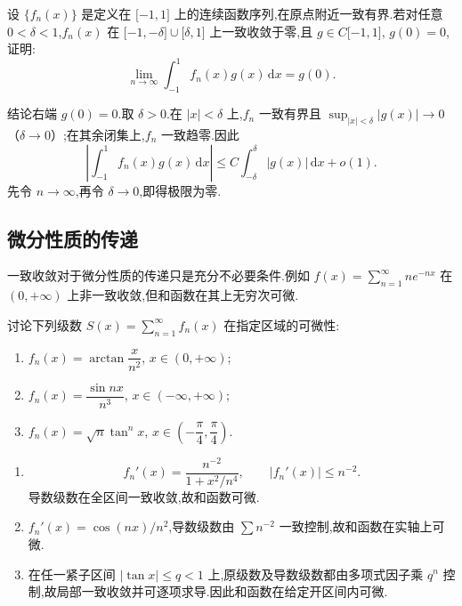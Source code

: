 \begin{example}
    设 $\{f_n(x)\}$ 是定义在 $\lbrack -1,1\rbrack$ 上的连续函数序列,在原点附近一致有界.若对任意 $0<\delta<1$,$f_n(x)$ 在 $\lbrack -1,-\delta\rbrack\cup\lbrack \delta,1\rbrack$ 上一致收敛于零,且 $g\in C\lbrack -1,1\rbrack$, $g(0)=0$,证明:
    \[
        \lim\limits_{n\to\infty}\int_{-1}^{1}f_n(x)g(x)\,\mathrm{d}x=g(0).
    \]
\end{example}
\exampleblank

\begin{solution}
    结论右端 $g(0)=0$.取 $\delta>0$.在 $|x|<\delta$ 上,$f_n$ 一致有界且
    $\sup_{|x|<\delta}|g(x)|\to0$（$\delta\to0$）;在其余闭集上,$f_n$ 一致趋零.因此
    \[
        \left|\int_{-1}^{1}f_n(x)g(x)\,\mathrm{d}x\right|
        \leq C\int_{-\delta}^{\delta}|g(x)|\,\mathrm{d}x+o(1).
    \]
    先令 $n\to\infty$,再令 $\delta\to0$,即得极限为零.
\end{solution}



\subsection{微分性质的传递}

一致收敛对于微分性质的传递只是充分不必要条件.例如 $\displaystyle f(x)=\sum\limits_{n=1}^{\infty}ne^{-nx}$ 在 $(0,+\infty)$ 上非一致收敛,但和函数在其上无穷次可微.

\begin{example}
    讨论下列级数 $\displaystyle S(x)=\sum\limits_{n=1}^{\infty}f_n(x)$ 在指定区域的可微性:
    \begin{enumerate}
        \item $f_n(x)=\arctan\dfrac{x}{n^2}$, $x\in(0,+\infty)$;
        \item $f_n(x)=\dfrac{\sin nx}{n^3}$, $x\in(-\infty,+\infty)$;
        \item $f_n(x)=\sqrt n\tan^n x$, $x\in\left(-\dfrac{\pi}{4},\dfrac{\pi}{4}\right)$.
    \end{enumerate}
\end{example}
\exampleblank

\begin{solution}
    \begin{enumerate}
        \item
              \[
                  f_n'(x)=\dfrac{n^{-2}}{1+x^2/n^4},\qquad |f_n'(x)|\leq n^{-2}.
              \]
              导数级数在全区间一致收敛,故和函数可微.
        \item $f_n'(x)=\cos(nx)/n^2$,导数级数由 $\sum n^{-2}$ 一致控制,故和函数在实轴上可微.
        \item 在任一紧子区间 $|\tan x|\leq q<1$ 上,原级数及导数级数都由多项式因子乘 $q^n$ 控制,故局部一致收敛并可逐项求导.因此和函数在给定开区间内可微.
    \end{enumerate}
\end{solution}

